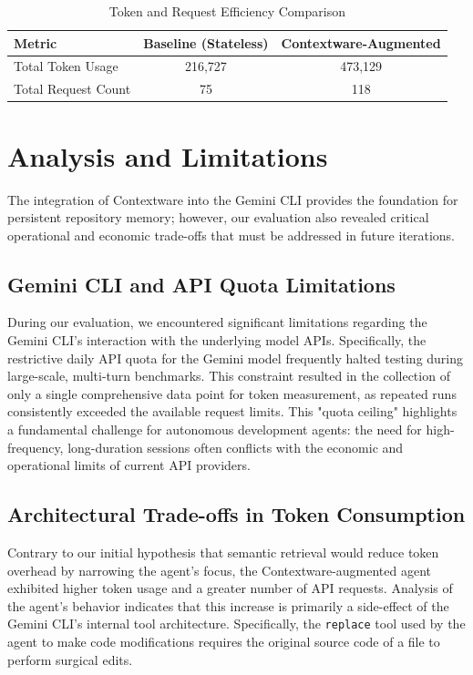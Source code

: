 \documentclass[conference]{IEEEtran}
\begin{document}
\begin{table}[htbp]
    \centering
    \caption{Token and Request Efficiency Comparison}
    \label{tab:efficiency}
    \begin{tabular}{|l|c|c|}
        \hline
        \textbf{Metric} & \textbf{Baseline (Stateless)} & \textbf{Contextware-Augmented} \\ \hline
        Total Token Usage & 216,727 & 473,129 \\ \hline
        Total Request Count & 75 & 118 \\ \hline
    \end{tabular}
\end{table}

\section{Analysis and Limitations}
The integration of Contextware into the Gemini CLI provides the foundation for persistent repository memory; however, our evaluation also revealed critical operational and economic trade-offs that must be addressed in future iterations.

\subsection{Gemini CLI and API Quota Limitations}
During our evaluation, we encountered significant limitations regarding the Gemini CLI's interaction with the underlying model APIs. Specifically, the restrictive daily API quota for the Gemini model frequently halted testing during large-scale, multi-turn benchmarks. This constraint resulted in the collection of only a single comprehensive data point for token measurement, as repeated runs consistently exceeded the available request limits. This "quota ceiling" highlights a fundamental challenge for autonomous development agents: the need for high-frequency, long-duration sessions often conflicts with the economic and operational limits of current API providers.

\subsection{Architectural Trade-offs in Token Consumption}
Contrary to our initial hypothesis that semantic retrieval would reduce token overhead by narrowing the agent's focus, the Contextware-augmented agent exhibited higher token usage and a greater number of API requests. Analysis of the agent's behavior indicates that this increase is primarily a side-effect of the Gemini CLI's internal tool architecture. Specifically, the \texttt{replace} tool used by the agent to make code modifications requires the original source code of a file to perform surgical edits. 
\end{document}
